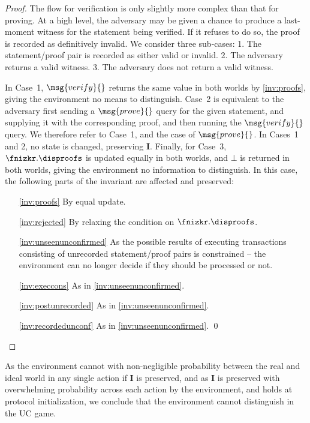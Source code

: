 \begin{proof}
The flow for verification is only slightly more complex than that for proving.
At a high level, the adversary may be given a chance to produce a last-moment
witness for the statement being verified. If it refuses to do so, the proof is
recorded as definitively invalid. We consider three sub-cases: 1. The
statement/proof pair is recorded as either valid or invalid. 2. The adversary
returns a valid witness. 3. The adversary does not return a valid witness.

In Case~1, $\msg{verify}{}$ returns the same value in both worlds by
\ref{inv:proofs}, giving the environment no means to distinguish. Case~2 is
equivalent to the adversary first sending a $\msg{prove}{}$ query for the given
statement, and supplying it with the corresponding proof, and then running the
$\msg{verify}{}$ query. We therefore refer to Case~1, and the case of
$\msg{prove}{}$. In Cases~1 and 2, no state is changed, preserving $\boldsymbol
I$. Finally, for Case~3, $\fnizkr.\disproofs$ is updated equally in both worlds,
and $\bot$ is returned in both worlds, giving the environment no information to
distinguish. In this case, the following parts of the invariant are affected and
preserved:

\begin{enumerate}
  \item[\ref{inv:proofs}] By equal update.
  \item[\ref{inv:rejected}] By relaxing the condition on
    $\fnizkr.\disproofs$.
  \item[\ref{inv:unseenunconfirmed}] As the possible results of executing
    transactions consisting of unrecorded statement/proof pairs is constrained
    -- the environment can no longer decide if they should be processed or not.
  \item[\ref{inv:execcons}] As in \ref{inv:unseenunconfirmed}.
  \item[\ref{inv:postunrecorded}] As in \ref{inv:unseenunconfirmed}.
  \item[\ref{inv:recordedunconf}] As in \ref{inv:unseenunconfirmed}.
  \qed
\end{enumerate}
\end{proof}

As the environment cannot with non-negligible probability between the real and
ideal world in any single action if $\boldsymbol I$ is preserved, and as
$\boldsymbol I$ is preserved with overwhelming probability across each action by
the environment, and holds at protocol initialization, we conclude that the
environment cannot distinguish in the UC game.%
%
